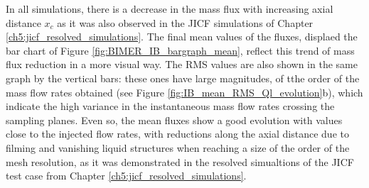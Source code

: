 In all simulations, there is a decrease in the mass flux with increasing axial distance $x_c$ as it was also observed in the JICF simulations of Chapter \ref{ch5:jicf_resolved_simulations}. The final mean values of the fluxes, displaed the bar chart of Figure \ref{fig:BIMER_IB_bargraph_mean}, reflect this trend of mass flux reduction in a more visual way. The RMS values are also shown in the same graph by the vertical bars: these ones have large magnitudes, of tthe order of the mass flow rates obtained (see Figure \ref{fig:IB_mean_RMS_Ql_evolution}b), which indicate the high variance in the instantaneous mass flow rates crossing the sampling planes. Even so, the mean fluxes show a good evolution with values close to the injected flow rates, with reductions along the axial distance due to filming and vanishing liquid structures when reaching a size of the order of the mesh resolution, as it was demonstrated in the resolved simualtions of the JICF test case from Chapter \ref{ch5:jicf_resolved_simulations}.

